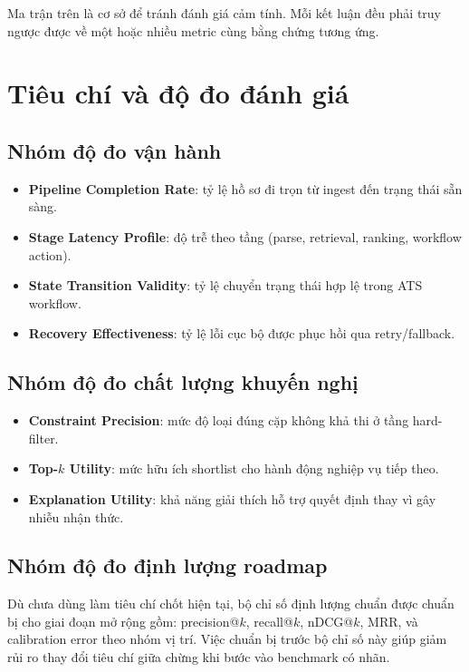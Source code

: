 Ma trận trên là cơ sở để tránh đánh giá cảm tính. Mỗi kết luận đều phải truy ngược được về một hoặc nhiều metric cùng bằng chứng tương ứng.

\section{Tiêu chí và độ đo đánh giá}

\subsection{Nhóm độ đo vận hành}

\begin{itemize}
  \item \textbf{Pipeline Completion Rate}: tỷ lệ hồ sơ đi trọn từ ingest đến trạng thái sẵn sàng.
  \item \textbf{Stage Latency Profile}: độ trễ theo tầng (parse, retrieval, ranking, workflow action).
  \item \textbf{State Transition Validity}: tỷ lệ chuyển trạng thái hợp lệ trong ATS workflow.
  \item \textbf{Recovery Effectiveness}: tỷ lệ lỗi cục bộ được phục hồi qua retry/fallback.
\end{itemize}

\subsection{Nhóm độ đo chất lượng khuyến nghị}

\begin{itemize}
  \item \textbf{Constraint Precision}: mức độ loại đúng cặp không khả thi ở tầng hard-filter.
  \item \textbf{Top-$k$ Utility}: mức hữu ích shortlist cho hành động nghiệp vụ tiếp theo.
  \item \textbf{Explanation Utility}: khả năng giải thích hỗ trợ quyết định thay vì gây nhiễu nhận thức.
\end{itemize}

\subsection{Nhóm độ đo định lượng roadmap}

Dù chưa dùng làm tiêu chí chốt hiện tại, bộ chỉ số định lượng chuẩn được chuẩn bị cho giai đoạn mở rộng gồm: precision@$k$, recall@$k$, nDCG@$k$, MRR, và calibration error theo nhóm vị trí. Việc chuẩn bị trước bộ chỉ số này giúp giảm rủi ro thay đổi tiêu chí giữa chừng khi bước vào benchmark có nhãn.

